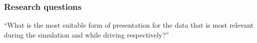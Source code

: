 \begin{frame}
\frametitle{Research questions}

\begin{PraesentationAufzaehlung}

    \item ``What is the most suitable form of presentation for the data that is most relevant during the simulation and
     while driving respectively?''


\end{PraesentationAufzaehlung}

\end{frame}
\clearpage